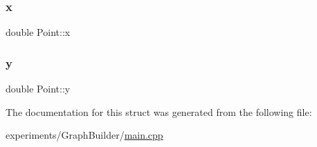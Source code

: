\subsubsection{\texorpdfstring{x}{x}}
{\footnotesize\ttfamily double Point\+::x}

\mbox{\label{struct_point_afa38be143ae800e6ad69ce8ed4df62d8}} 
\subsubsection{\texorpdfstring{y}{y}}
{\footnotesize\ttfamily double Point\+::y}



The documentation for this struct was generated from the following file\+:\begin{DoxyCompactItemize}
\item 
experiments/\+Graph\+Builder/\mbox{\hyperlink{experiments_2_graph_builder_2main_8cpp}{main.\+cpp}}\end{DoxyCompactItemize}
